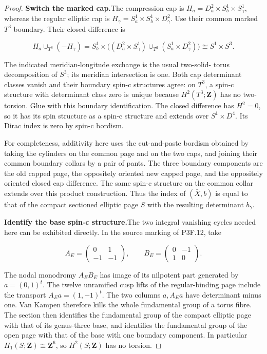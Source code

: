 \begin{proof}
\par\medskip\noindent\textbf{Switch the marked cap.}\enspace The compression cap is
\(H_a=D^2_a\times S^1_b\times S^1_\gamma\), whereas the regular
elliptic cap is \(H_\gamma=S^1_a\times S^1_b\times D^2_\gamma\).
Use their common marked \(T^3\) boundary.  Their closed difference
is

\[
 H_a\cup_{T^3}(-H_\gamma)
 =S^1_b\times
   \bigl((D^2_a\times S^1_\gamma)
       \cup_{T^2}(S^1_a\times D^2_\gamma)\bigr)
 \cong S^1\times S^3.
\]

The indicated meridian-longitude exchange is the usual two-solid-
torus decomposition of \(S^3\); its meridian intersection is one.
Both cap determinant classes vanish and their boundary spin-c
structures agree: on \(T^3\), a spin-c structure with determinant
class zero is unique because \(H^2(T^3;\mathbf Z)\) has no
two-torsion.  Glue with this boundary identification.  The closed
difference has \(H^2=0\), so it has its spin structure as a spin-c
structure and extends over \(S^1\times D^4\).  Its Dirac index is
zero by spin-c bordism.

For completeness, additivity here uses the cut-and-paste bordism
obtained by taking the cylinders on the common page and on the
two caps, and joining their common boundary collars by a pair of
pants.  The three boundary components are the old capped page,
the oppositely oriented new capped page, and the oppositely
oriented closed cap difference.  The same spin-c structure on the
common collar extends over this product construction.  Thus the
index of \((\bar X,b)\) is equal to that of the compact sectioned
elliptic page \(S\) with the resulting determinant \(b_\gamma\).

\par\medskip\noindent\textbf{Identify the base spin-c structure.}\enspace The two integral
vanishing cycles needed here can be exhibited directly.  In the
source marking of P3F.12, take

\[
 A_E=\begin{pmatrix}0&1\\-1&-1\end{pmatrix},\qquad
 B_E=\begin{pmatrix}0&-1\\1&0\end{pmatrix}.
\]

The nodal monodromy \(A_EB_E\) has image of its nilpotent part
generated by \(a=(0,1)^t\).  The twelve unramified cusp lifts of
the regular-binding page include the transport \(A_Ea=(1,-1)^t\).
The two columns \(a,A_Ea\) have determinant minus one.  Van Kampen
therefore kills the whole fundamental group of a torus fibre.
The section then identifies the fundamental group of the compact
elliptic page with that of its genus-three base, and identifies
the fundamental group of the open page with that of the base
with one boundary component.  In particular \(H_1(S;\mathbf Z)
\cong\mathbf Z^6\), so \(H^2(S;\mathbf Z)\) has no torsion.


\end{proof}
